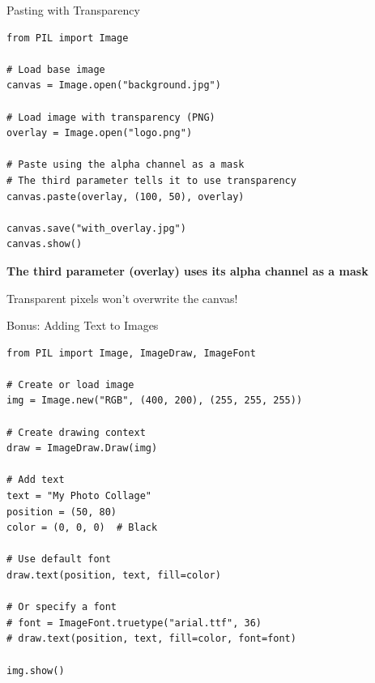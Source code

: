 \documentclass{csbeamer}
\begin{document}
\begin{frame}[fragile]{Pasting with Transparency}
    \begin{lstlisting}
from PIL import Image

# Load base image
canvas = Image.open("background.jpg")

# Load image with transparency (PNG)
overlay = Image.open("logo.png")

# Paste using the alpha channel as a mask
# The third parameter tells it to use transparency
canvas.paste(overlay, (100, 50), overlay)

canvas.save("with_overlay.jpg")
canvas.show()
    \end{lstlisting}

    \vspace{1em}

    \textbf{The third parameter (overlay) uses its alpha channel as a mask}

    \vspace{0.5em}

    Transparent pixels won't overwrite the canvas!
\end{frame}


\begin{frame}[fragile]{Bonus: Adding Text to Images}
    \begin{lstlisting}
from PIL import Image, ImageDraw, ImageFont

# Create or load image
img = Image.new("RGB", (400, 200), (255, 255, 255))

# Create drawing context
draw = ImageDraw.Draw(img)

# Add text
text = "My Photo Collage"
position = (50, 80)
color = (0, 0, 0)  # Black

# Use default font
draw.text(position, text, fill=color)

# Or specify a font
# font = ImageFont.truetype("arial.ttf", 36)
# draw.text(position, text, fill=color, font=font)

img.show()
    \end{lstlisting}
\end{frame}
\end{document}
